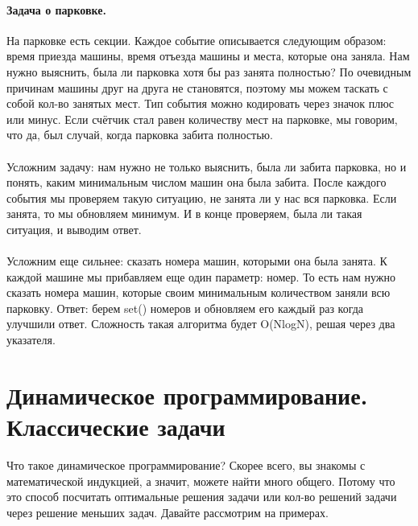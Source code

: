 \documentclass[a4paper,12pt]{article}
\begin{document}
\paragraph{Задача о парковке.}
На парковке есть секции. Каждое событие описывается следующим образом: время приезда машины, время отъезда машины и места, которые она заняла. Нам нужно выяснить, была ли парковка хотя бы раз занята полностью? По очевидным причинам машины друг на друга не становятся, поэтому мы можем таскать с собой кол-во занятых мест. Тип события можно кодировать через значок плюс или минус. Если счётчик стал равен количеству мест на парковке, мы говорим, что да, был случай, когда парковка забита полностью. \\ \\ Усложним задачу: нам нужно не только выяснить, была ли забита парковка, но и понять, каким минимальным числом машин она была забита. После каждого события мы проверяем такую ситуацию, не занята ли у нас вся парковка. Если занята, то мы обновляем минимум. И в конце проверяем, была ли такая ситуация, и выводим ответ. \\ \\Усложним еще сильнее: сказать номера машин, которыми она была занята. К каждой машине мы прибавляем еще один параметр: номер. То есть нам нужно сказать номера машин, которые своим минимальным количеством заняли всю парковку. Ответ: берем set() номеров и обновляем его каждый раз когда улучшили ответ. Сложность такая алгоритма будет O(NlogN), решая через два указателя.
\newpage
\section{Динамическое программирование. Классические задачи}
Что такое динамическое программирование? Скорее всего, вы знакомы с математической индукцией, а значит, можете найти много общего. Потому что это способ посчитать оптимальные решения задачи или кол-во решений задачи через решение меньших задач. Давайте рассмотрим на примерах.
\end{document}
